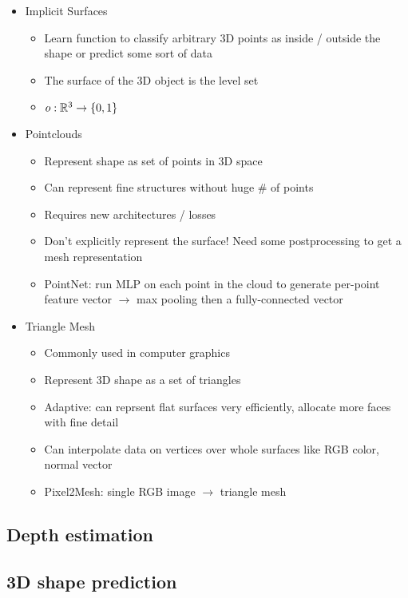 \documentclass[../main.tex]{subfiles}
\begin{document}
\begin{itemize}
  \item Implicit Surfaces
  \begin{itemize}
    \item Learn function to classify arbitrary 3D points as inside / outside the shape or predict some sort of data
    \item The surface of the 3D object is the level set
    \item $o: \mathbb{R}^{3} \rightarrow \{0,1\}$
  \end{itemize}

  \item Pointclouds
  \begin{itemize}
    \item Represent shape as set of points in 3D space
    \item Can represent fine structures without huge \# of points
    \item Requires new architectures / losses
    \item Don't explicitly represent the surface! Need some postprocessing to get a mesh representation
    \item PointNet: run MLP on each point in the cloud to generate per-point feature vector $\rightarrow$ max pooling then a fully-connected vector
  \end{itemize}

  \item Triangle Mesh
  \begin{itemize}
    \item Commonly used in computer graphics
    \item Represent 3D shape as a set of triangles
    \item Adaptive: can reprsent flat surfaces very efficiently, allocate more faces with fine detail
    \item Can interpolate data on vertices over whole surfaces like RGB color, normal vector
    \item Pixel2Mesh: single RGB image $\rightarrow$ triangle mesh
  \end{itemize}

\end{itemize}

\subsection{Depth estimation}
\subsection{3D shape prediction}
\end{document}
